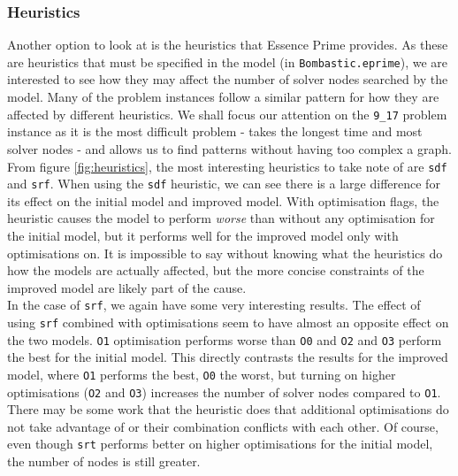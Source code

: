 \documentclass{article}
\newcommand{\n}[0]{\\[\baselineskip]}
\begin{document}
\subsubsection{Heuristics}
Another option to look at is the heuristics that Essence Prime provides. As these are heuristics that must be specified in the model (in \texttt{Bombastic.eprime}), we are interested to see how they may affect the number of solver nodes searched by the model. Many of the problem instances follow a similar pattern for how they are affected by different heuristics. We shall focus our attention on the \texttt{9\_17} problem instance as it is the most difficult problem - takes the longest time and most solver nodes - and allows us to find patterns without having too complex a graph.
\n
From figure \ref{fig:heuristics}, the most interesting heuristics to take note of are \texttt{sdf} and \texttt{srf}. When using the \texttt{sdf} heuristic, we can see there is a large difference for its effect on the initial model and improved model. With optimisation flags, the heuristic causes the model to perform \textit{worse} than without any optimisation for the initial model, but it performs well for the improved model only with optimisations on. It is impossible to say without knowing what the heuristics do how the models are actually affected, but the more concise constraints of the improved model are likely part of the cause. 
\n
In the case of \texttt{srf}, we again have some very interesting results. The effect of using \texttt{srf} combined with optimisations seem to have almost an opposite effect on the two models. \texttt{O1} optimisation performs worse than \texttt{O0} and \texttt{O2} and \texttt{O3} perform the best for the initial model. This directly contrasts the results for the improved model, where \texttt{O1} performs the best, \texttt{O0} the worst, but turning on higher optimisations (\texttt{O2} and \texttt{O3}) increases the number of solver nodes compared to \texttt{O1}. There may be some work that the heuristic does that additional optimisations do not take advantage of or their combination conflicts with each other. Of course, even though \texttt{srt} performs better on higher optimisations for the initial model, the number of nodes is still greater. 
\end{document}
